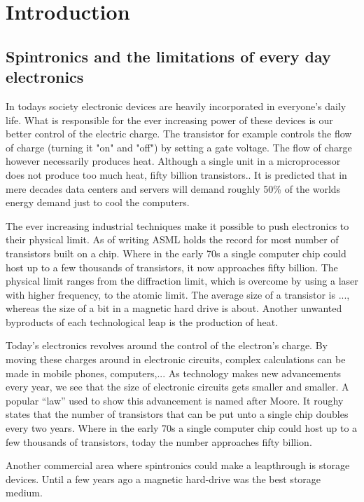 \chapter{Introduction}\label{ch:introduction}
\section{Spintronics and the limitations of every day electronics}
In todays society electronic devices are heavily incorporated in everyone's daily life. What is responsible for the ever increasing power of these devices is our better control of the electric charge. The transistor for example controls the flow of charge (turning it "on" and "off") by setting a gate voltage. The flow of charge however necessarily produces heat. Although a single unit in a microprocessor does not produce too much heat, fifty billion transistors.. It is predicted that in mere decades data centers and servers will demand roughly 50\% of the worlds energy demand just to cool the computers. 

The ever increasing industrial techniques make it possible to push electronics to their physical limit. As of writing ASML holds the record for most number of transistors built on a chip. Where in the early 70s a single computer chip could host up to a few thousands of transistors, it now approaches fifty billion. The physical limit ranges from the diffraction limit, which is overcome by using a laser with higher frequency, to the atomic limit. The average size of a transistor is ..., whereas the size of a bit in a magnetic hard drive is about. Another unwanted byproducts of each technological leap is the production of heat. 

Today's electronics revolves around the control of the electron's charge. By moving these charges around in electronic circuits, complex calculations can be made in mobile phones, computers,... As technology makes new advancements every year, we see that the size of electronic circuits gets smaller and smaller. A popular ``law'' used to show this advancement is named after Moore. It roughy states that the number of transistors that can be put unto a single chip doubles every two years. Where in the early 70s a single computer chip could host up to a few thousands of transistors, today the number approaches fifty billion.  

Another commercial area where spintronics could make a leapthrough is storage devices. Until a few years ago a magnetic hard-drive was the best storage medium. 

